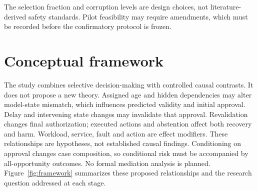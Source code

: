 ﻿\documentclass[sigconf,nonacm]{acmart}
\begin{document}
The selection fraction and corruption levels are design choices, not literature-derived safety standards. Pilot feasibility may require amendments, which must be recorded before the confirmatory protocol is frozen.

\section{Conceptual framework}
The study combines selective decision-making with controlled causal contrasts. It does not propose a new theory. Assigned age and hidden dependencies may alter model-state mismatch, which influences predicted validity and initial approval. Delay and intervening state changes may invalidate that approval. Revalidation changes final authorization; executed actions and abstention affect both recovery and harm. Workload, service, fault and action are effect modifiers. These relationships are hypotheses, not established causal findings. Conditioning on approval changes case composition, so conditional risk must be accompanied by all-opportunity outcomes. No formal mediation analysis is planned. Figure~\ref{fig:framework} summarizes these proposed relationships and the research question addressed at each stage.
\end{document}
